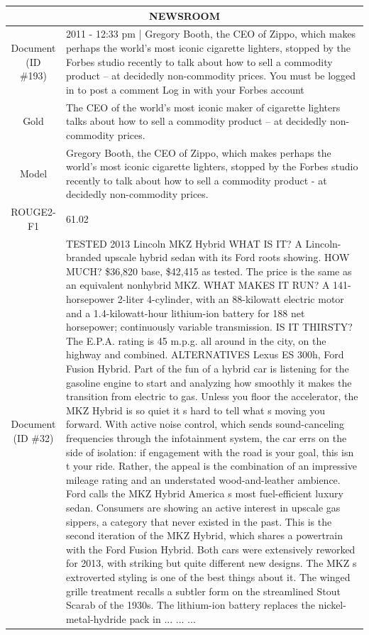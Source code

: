 \begin{table}[bth!]
\scriptsize
\centering
\renewcommand{\arraystretch}{1.3}
\begin{tabular}{c|p{}}
\hline
\multicolumn{2}{c}{NEWSROOM} \\ \hline
\makecell{Document\\(ID \#193)} & 
2011 - 12:33 pm | Gregory Booth, the CEO of Zippo, which makes perhaps the world’s most iconic cigarette lighters, stopped by the Forbes studio recently to talk about how to sell a commodity product – at decidedly non-commodity prices. You must be logged in to post a comment Log in with your Forbes account
\\ \hline
Gold & 
The CEO of the world's most iconic maker of cigarette lighters talks about how to sell a commodity product -- at decidedly non-commodity prices.
\\ \hline
Model & 
Gregory Booth, the CEO of Zippo, which makes perhaps the world's most iconic cigarette lighters, stopped by the Forbes studio recently to talk about how to sell a commodity product - at decidedly non-commodity prices.
\\ \hline
ROUGE2-F1 & 
61.02
\\ \hline
\makecell{Document\\(ID \#32)} & 
TESTED 2013 Lincoln MKZ Hybrid WHAT IS IT? A Lincoln-branded upscale hybrid sedan with its Ford roots showing. HOW MUCH? \$36,820 base, \$42,415 as tested. The price is the same as an equivalent nonhybrid MKZ. WHAT MAKES IT RUN? A 141-horsepower 2-liter 4-cylinder, with an 88-kilowatt electric motor and a 1.4-kilowatt-hour lithium-ion battery for 188 net horsepower; continuously variable transmission. IS IT THIRSTY? The E.P.A. rating is 45 m.p.g. all around    in the city, on the highway and combined. ALTERNATIVES Lexus ES 300h, Ford Fusion Hybrid. Part of the fun of a hybrid car is listening for the gasoline engine to start and analyzing how smoothly it makes the transition from electric to gas. Unless you floor the accelerator, the MKZ Hybrid is so quiet it  s hard to tell what  s moving you forward. With active noise control, which sends sound-canceling frequencies through the infotainment system, the car errs on the side of isolation: if engagement with the road is your goal, this isn  t your ride. Rather, the appeal is the combination of an impressive mileage rating and an understated wood-and-leather ambience. Ford calls the MKZ Hybrid   America  s most fuel-efficient luxury sedan.   Consumers are showing an active interest in upscale gas sippers, a category that never existed in the past. This is the second iteration of the MKZ Hybrid, which shares a powertrain with the Ford Fusion Hybrid. Both cars were extensively reworked for 2013, with striking    but quite different    new designs. The MKZ  s extroverted styling is one of the best things about it. The winged grille treatment recalls a subtler form on the streamlined Stout Scarab of the 1930s. The lithium-ion battery replaces the nickel-metal-hydride pack in ... ... ... 

\end{tabular}
\end{table}

